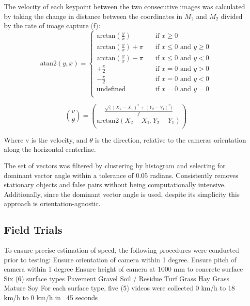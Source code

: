 The velocity of each keypoint between the two consecutive images was
calculated by taking the change in distance between the coordinates in $M_{1}$ and
$M_{2}$ divided by the rate of image capture (f):
\begin{equation}
  \text{atan2}(y,x) = 
  \begin{cases}
    \text{arctan}(\frac{y}{x})  & \quad \text{if } x \ge 0  \\
    \text{arctan}(\frac{y}{x}) + \pi  & \quad \text{if } x \le 0
    \text{ and } y \ge 0 \\
    \text{arctan}(\frac{y}{x}) - \pi  & \quad \text{if } x \le 0
    \text{ and } y < 0  \\
    +\frac{\pi}{2}  & \quad \text{if } x = 0
    \text{ and } y > 0  \\
    -\frac{\pi}{2}  & \quad \text{if } x = 0
    \text{ and } y < 0 \\
    \text{undefined}  & \quad \text{if } x = 0
    \text{ and } y = 0  \\
  \end{cases}
\label{eq:atan2}
\end{equation}

\begin{equation}
\binom{v}{\theta} = \binom{\frac{\sqrt((X_{2} - X_{1})^2 + (Y_{2} - Y_{1})^2)}{f}}{\text{arctan2}(X_{2} - X_{1}, Y_{2} - Y_{1})}
\label{eq:pts2vector}
\end{equation}
\begin{flushleft}
Where v is the velocity, and $\theta$ is the direction, relative to
the cameras orientation along the horizontal centerline.
\end{flushleft}

The set of vectors was filtered by clustering by histogram and
selecting for dominant vector angle within a tolerance of 0.05
radians. Consistently removes stationary objects and false pairs
without being computationally intensive. Additionally, since the
dominant vector angle is used, despite its simplicity this approach is
orientation-agnostic.

\subsection{Field Trials}
To ensure precise estimation of speed, the following procedures were conducted prior to testing:
Ensure orientation of camera within 1 degree.
Ensure pitch of camera within 1 degree
Ensure height of camera at 1000 mm to concrete surface
Six (6) surface types
Pavement
Gravel
Soil / Residue
Turf Grass
Hay Grass
Mature Soy
For each surface type, five (5) videos were collected
0 km/h to 18 km/h to 0 km/h in ~45 seconds


